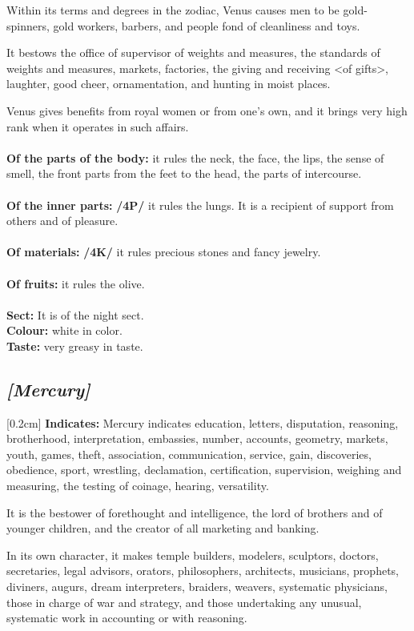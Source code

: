 \mndl[0.2cm]
Within its terms and degrees in the zodiac, Venus causes men to be gold-spinners, gold workers, barbers, and people fond of cleanliness and toys. 

It bestows the office of supervisor of weights and measures, the standards of weights and measures, markets, factories, the giving and receiving <of gifts>, laughter, good cheer, ornamentation, and hunting in moist places.

Venus gives benefits from royal women or from one’s own, and it brings very high rank when it operates in such affairs. \\
\\
\textbf{Of the parts of the body:} it rules the neck, the face, the lips, the sense of smell, the front parts from the feet to the head, the parts of intercourse. \\
\\
\textbf{Of the inner parts:} \textbf{/4P/} it rules the lungs. It is a recipient of support from others and of pleasure.\\ 
\\
\textbf{Of materials:} \textbf{/4K/} it rules precious
stones and fancy jewelry. \\
\\ 
\textbf{Of fruits:} it rules the olive. \\
\\
\textbf{Sect:} It is of the night sect.\\
\textbf{Colour:} white in color. \\
\textbf{Taste:} very greasy in taste.

\secbr
\subsection{\textit{[Mercury]}}
[0.2cm]
\noindent
\textbf{Indicates:} Mercury indicates education, letters, disputation, reasoning, brotherhood, interpretation, embassies, number, accounts, geometry, markets, youth, games, theft, association, communication, service, gain, discoveries, obedience, sport, wrestling, declamation, certification, supervision, weighing and measuring, the testing of coinage, hearing, versatility. 

It is the bestower of forethought and intelligence, the lord of brothers and of younger children, and the creator of all marketing and banking. 

In its own character, it makes temple builders, modelers, sculptors, doctors, secretaries, legal advisors, orators, philosophers, architects, musicians, prophets, diviners, augurs, dream interpreters, braiders, weavers, systematic physicians, those in charge of war and strategy, and those undertaking any unusual, systematic work in accounting or with reasoning. 

